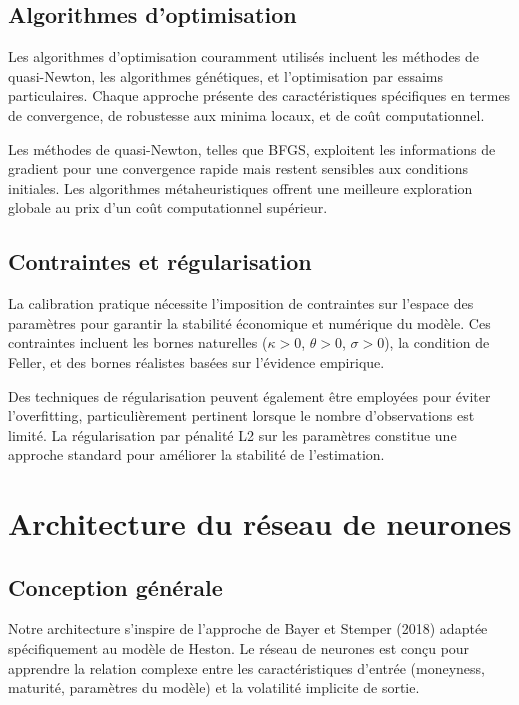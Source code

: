 \subsection{Algorithmes d'optimisation}

Les algorithmes d'optimisation couramment utilisés incluent les méthodes de quasi-Newton, les algorithmes génétiques, et l'optimisation par essaims particulaires. Chaque approche présente des caractéristiques spécifiques en termes de convergence, de robustesse aux minima locaux, et de coût computationnel.

Les méthodes de quasi-Newton, telles que BFGS, exploitent les informations de gradient pour une convergence rapide mais restent sensibles aux conditions initiales. Les algorithmes métaheuristiques offrent une meilleure exploration globale au prix d'un coût computationnel supérieur.

\subsection{Contraintes et régularisation}

La calibration pratique nécessite l'imposition de contraintes sur l'espace des paramètres pour garantir la stabilité économique et numérique du modèle. Ces contraintes incluent les bornes naturelles ($\kappa > 0$, $\theta > 0$, $\sigma > 0$), la condition de Feller, et des bornes réalistes basées sur l'évidence empirique.

Des techniques de régularisation peuvent également être employées pour éviter l'overfitting, particulièrement pertinent lorsque le nombre d'observations est limité. La régularisation par pénalité L2 sur les paramètres constitue une approche standard pour améliorer la stabilité de l'estimation.

\section{Architecture du réseau de neurones}

\subsection{Conception générale}

Notre architecture s'inspire de l'approche de Bayer et Stemper (2018) adaptée spécifiquement au modèle de Heston. Le réseau de neurones est conçu pour apprendre la relation complexe entre les caractéristiques d'entrée (moneyness, maturité, paramètres du modèle) et la volatilité implicite de sortie.

